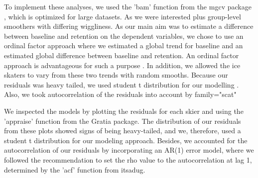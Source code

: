 \documentclass{article}
\begin{document}
To implement these analyses, we used the 'bam' function from the mgcv package \cite{mgcv}, which is optimized for large datasets. As we were interested plus group-level smoothers with differing wiggliness. As our main aim was to estimate a difference between baseline and retention on the dependent variables, we chose to use an ordinal factor approach where we estimated a global trend for baseline and an estimated global difference between baseline and retention. An ordinal factor approach is advantageous for such a purpose \cite{soskuthy_evaluating_2021}. In addition, we allowed the ice skaters to vary from these two trends with random smooths. Because our residuals was heavy tailed, we used student t distribution for our modelling \cite{soskuthy_evaluating_2021}. Also, we took autocorrelation of the residuals into account by family="scat"

We inspected the models by plotting the residuals for each skier and using the 'appraise' function from the Gratia package. The distribution of our residuals from these plots showed signs of being heavy-tailed, and we, therefore, used a student t distribution for our modeling approach. Besides, we accounted for the autocorrelation of our residuals by incorporating an AR(1) error model, where we followed the recommendation to set the rho value to the autocorrelation at lag 1, determined by the 'acf' function from itsadug.







\printbibliography %
\end{document}
